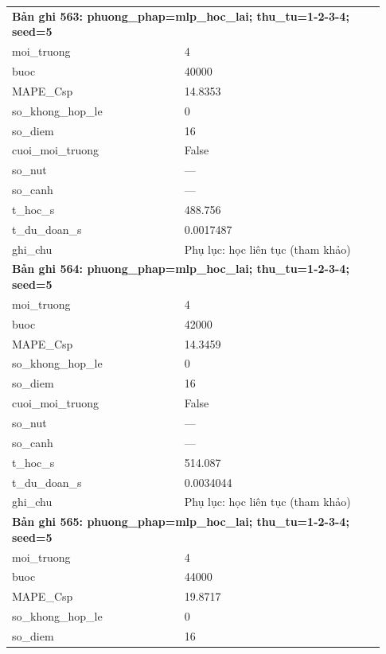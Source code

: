 \begin{longtable}{p{0.43\linewidth}p{0.50\linewidth}}
\midrule
\multicolumn{2}{p{0.95\linewidth}}{\textbf{Bản ghi 563: phuong\_phap=mlp\_hoc\_lai; thu\_tu=1-2-3-4; seed=5}} \\
moi\_\allowbreak truong & 4 \\
buoc & 40000 \\
MAPE\_\allowbreak Csp & 14.8353 \\
so\_\allowbreak khong\_\allowbreak hop\_\allowbreak le & 0 \\
so\_\allowbreak diem & 16 \\
cuoi\_\allowbreak moi\_\allowbreak truong & False \\
so\_\allowbreak nut & — \\
so\_\allowbreak canh & — \\
t\_\allowbreak hoc\_\allowbreak s & 488.756 \\
t\_\allowbreak du\_\allowbreak doan\_\allowbreak s & 0.0017487 \\
ghi\_\allowbreak chu & Phụ lục: học liên tục (tham khảo) \\
\midrule
\multicolumn{2}{p{0.95\linewidth}}{\textbf{Bản ghi 564: phuong\_phap=mlp\_hoc\_lai; thu\_tu=1-2-3-4; seed=5}} \\
moi\_\allowbreak truong & 4 \\
buoc & 42000 \\
MAPE\_\allowbreak Csp & 14.3459 \\
so\_\allowbreak khong\_\allowbreak hop\_\allowbreak le & 0 \\
so\_\allowbreak diem & 16 \\
cuoi\_\allowbreak moi\_\allowbreak truong & False \\
so\_\allowbreak nut & — \\
so\_\allowbreak canh & — \\
t\_\allowbreak hoc\_\allowbreak s & 514.087 \\
t\_\allowbreak du\_\allowbreak doan\_\allowbreak s & 0.0034044 \\
ghi\_\allowbreak chu & Phụ lục: học liên tục (tham khảo) \\
\midrule
\multicolumn{2}{p{0.95\linewidth}}{\textbf{Bản ghi 565: phuong\_phap=mlp\_hoc\_lai; thu\_tu=1-2-3-4; seed=5}} \\
moi\_\allowbreak truong & 4 \\
buoc & 44000 \\
MAPE\_\allowbreak Csp & 19.8717 \\
so\_\allowbreak khong\_\allowbreak hop\_\allowbreak le & 0 \\
so\_\allowbreak diem & 16 \\

\end{longtable}
